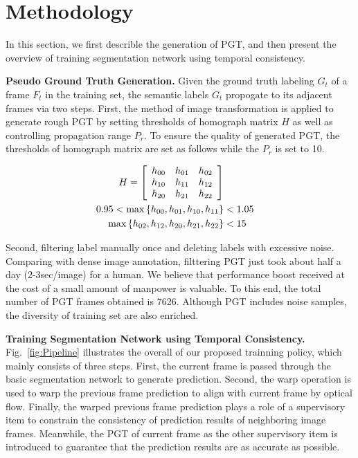 \section{Methodology}
\label{sec:metho}
In this section, we first describle the generation of PGT, and then present the overview of training segmentation network using temporal consistency.

{\bf Pseudo Ground Truth Generation.}
%
Given the ground truth labeling ${G_t}$ of a frame ${F_t}$ in the training set, the semantic labels ${G_t}$ propogate to its adjacent frames via two steps.
%
First, the method of image transformation is applied to generate rough PGT by setting thresholds of homograph matrix ${H}$ as well as controlling propagation range ${P_r}$.
%
To ensure the quality of generated PGT, the thresholds of homograph matrix are set as follows while the ${P_r}$ is set to 10.

\begin{equation}
\centering
\begin{aligned}
H
=
\left[
\begin{array}{ccc}
h_{00} & h_{01} & h_{02}\\
h_{10} & h_{11} & h_{12}\\
h_{20} & h_{21} & h_{22}\\
\end{array}
\right] \\
0.95<\max{\left\{h_{00},h_{01},h_{10},h_{11}\right\}}&<1.05\\
\max{\left\{h_{02},h_{12},h_{20},h_{21},h_{22}\right\}}&<15\\
\end{aligned}
\end{equation}

Second, filtering label manually once and deleting labels with excessive noise.
%
Comparing with dense image annotation, filttering PGT just took about half a day (2-3sec/image) for a human.
%
We believe that performance boost received at the cost of a small amount of manpower is valuable.
%
To this end, the total number of PGT frames obtained is 7626.
%
Although PGT includes noise samples, the diversity of training set are also enriched. 


{\bf Training Segmentation Network using Temporal Consistency.}
%
Fig.~\ref{fig:Pipeline} illustrates the overall of our proposed trainning policy, which mainly consists of three steps.
%
First, the current frame is passed through the basic segmentation network to generate prediction.
%
Second, the warp operation is used to warp the previous frame prediction to align with current frame by optical flow.
%
Finally, the warped previous frame prediction plays a role of a supervisory item to constrain the consistency of prediction results of neighboring image frames.
%
Meanwhile, the PGT of current frame as the other supervisory item is introduced to guarantee that the prediction results are as accurate as possible.



